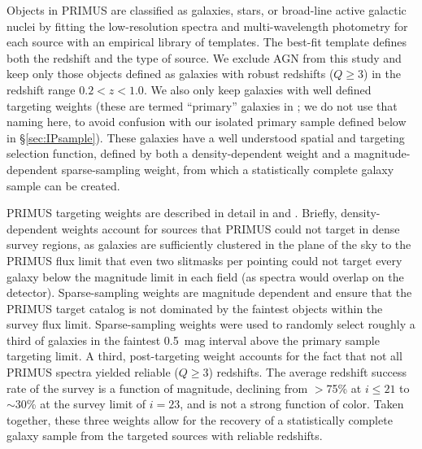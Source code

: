 Objects in PRIMUS are classified as galaxies, stars, or broad-line active galactic nuclei by fitting the low-resolution spectra and multi-wavelength photometry 
for each source with an empirical library of templates.
The best-fit template defines both the redshift and the type of source.  
We exclude AGN from this study and keep only those objects defined as galaxies with robust redshifts {($Q\ge 3$)} in the redshift range {$0.2 < z < 1.0$}.
We also only keep galaxies with well defined targeting weights (these are termed ``primary'' galaxies in \citet{Coil11}; we do not use that naming here, to avoid 
confusion with our isolated primary sample defined below in \S\ref{sec:IPsample}).
These galaxies have a well understood spatial and targeting selection function, defined by both a density-dependent weight and a magnitude-dependent sparse-sampling 
weight, from which a statistically complete galaxy sample can be created.

PRIMUS targeting weights are described in detail in \citet{Coil11} and \citet{Cool13}.
Briefly, density-dependent weights account for sources that PRIMUS could not target in dense survey regions, as galaxies are sufficiently clustered in the 
plane of
the sky to the PRIMUS flux limit that even two slitmasks per pointing could not target every galaxy below the magnitude limit in each field (as spectra would overlap on the detector). 
Sparse-sampling weights are magnitude dependent and ensure that the PRIMUS target catalog is not dominated by the faintest objects within the survey flux limit. Sparse-sampling weights were used to randomly select roughly a third 
of galaxies in the faintest 0.5~mag interval above the primary sample 
targeting limit.
A third, post-targeting weight \citep[detailed in][]{Cool13} accounts for the fact that not all PRIMUS spectra yielded reliable {($Q \ge 3$)} redshifts.
The average redshift success rate of the survey is a function of magnitude, declining from $>$75\% at {$i\le21$} to $\sim$30\% at the survey limit of $i=23$, and is not a strong function of color.  
Taken together, these three weights allow for the recovery of a statistically complete galaxy sample from the targeted sources with reliable redshifts.  

